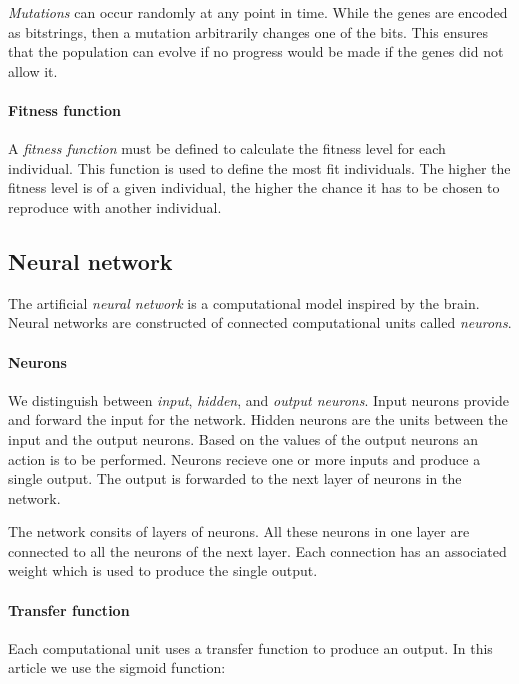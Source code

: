 
\emph{Mutations} can occur randomly at any point in time.
While the genes are encoded as bitstrings, then a mutation arbitrarily changes one of the bits.
This ensures that the population can evolve if no progress would be made if the genes did not allow it.

\paragraph{Fitness function}

A \emph{fitness function} must be defined to calculate the fitness level for each individual.
This function is used to define the most fit individuals.
The higher the fitness level is of a given individual, the higher the chance it has to be chosen to reproduce with another individual.

\subsection{Neural network}

The artificial \emph{neural network} is a computational model inspired by the brain.
Neural networks are constructed of connected computational units called \emph{neurons}.

\paragraph{Neurons}

We distinguish between \emph{input}, \emph{hidden}, and \emph{output neurons}. 
Input neurons provide and forward the input for the network.
Hidden neurons are the units between the input and the output neurons. 
Based on the values of the output neurons an action is to be performed.
Neurons recieve one or more inputs and produce a single output.
The output is forwarded to the next layer of neurons in the network.

The network consits of layers of neurons.
All these neurons in one layer are connected to all the neurons of the next layer.
Each connection has an associated weight which is used to produce the single output.

\paragraph{Transfer function}

Each computational unit uses a transfer function to produce an output.
In this article we use the sigmoid function:

